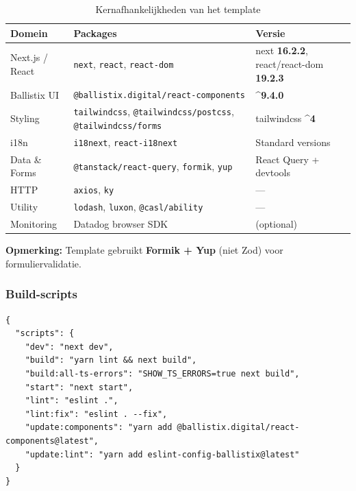 \begin{table}[htbp]
  \centering
  \caption{Kernafhankelijkheden van het template}
  \label{tab:template-deps}
  \small
  \begin{tabularx}{\textwidth}{|l|l|X|}
    \hline
    \textbf{Domein} & \textbf{Packages} & \textbf{Versie} \\
    \hline
    Next.js / React &
    \texttt{next}, \texttt{react}, \texttt{react-dom} &
    next \textbf{16.2.2}, react/react-dom \textbf{19.2.3} \\
    \hline
    Ballistix UI &
    \texttt{@ballistix.digital/react-components} &
    \textbf{\textasciicircum 9.4.0} \\
    \hline
    Styling &
    \texttt{tailwindcss}, \texttt{@tailwindcss/postcss}, \texttt{@tailwindcss/forms} &
    tailwindcss \textbf{\textasciicircum 4} \\
    \hline
    i18n &
    \texttt{i18next}, \texttt{react-i18next} &
    Standard versions \\
    \hline
    Data \& Forms &
    \texttt{@tanstack/react-query}, \texttt{formik}, \texttt{yup} &
    React Query + devtools \\
    \hline
    HTTP & \texttt{axios}, \texttt{ky} & — \\
    \hline
    Utility &
    \texttt{lodash}, \texttt{luxon}, \texttt{@casl/ability} &
    — \\
    \hline
    Monitoring &
    Datadog browser SDK &
    (optional) \\
    \hline
  \end{tabularx}
\end{table}

\noindent
\textbf{Opmerking:} Template gebruikt \textbf{Formik + Yup} (niet Zod) voor formuliervalidatie.

\subsubsection{Build-scripts}

\begin{verbatim}
{
  "scripts": {
    "dev": "next dev",
    "build": "yarn lint && next build",
    "build:all-ts-errors": "SHOW_TS_ERRORS=true next build",
    "start": "next start",
    "lint": "eslint .",
    "lint:fix": "eslint . --fix",
    "update:components": "yarn add @ballistix.digital/react-components@latest",
    "update:lint": "yarn add eslint-config-ballistix@latest"
  }
}
\end{verbatim}


